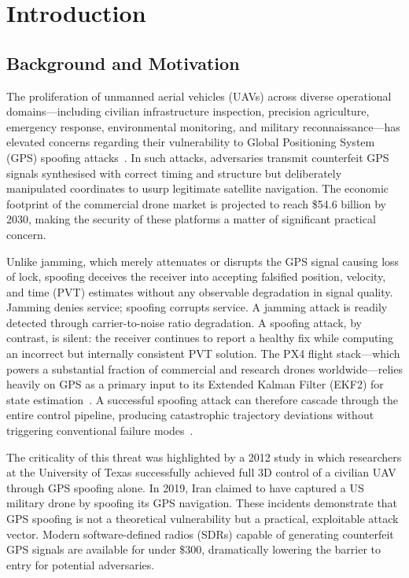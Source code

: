 \chapter{Introduction}

\section{Background and Motivation}

The proliferation of unmanned aerial vehicles (UAVs) across diverse operational domains---including civilian infrastructure inspection, precision agriculture, emergency response, environmental monitoring, and military reconnaissance---has elevated concerns regarding their vulnerability to Global Positioning System (GPS) spoofing attacks~\cite{Humphreys2012}. In such attacks, adversaries transmit counterfeit GPS signals synthesised with correct timing and structure but deliberately manipulated coordinates to usurp legitimate satellite navigation. The economic footprint of the commercial drone market is projected to reach \$54.6 billion by 2030, making the security of these platforms a matter of significant practical concern.

Unlike jamming, which merely attenuates or disrupts the GPS signal causing loss of lock, spoofing deceives the receiver into accepting falsified position, velocity, and time (PVT) estimates without any observable degradation in signal quality. Jamming denies service; spoofing corrupts service. A jamming attack is readily detected through carrier-to-noise ratio degradation. A spoofing attack, by contrast, is silent: the receiver continues to report a healthy fix while computing an incorrect but internally consistent PVT solution. The PX4 flight stack---which powers a substantial fraction of commercial and research drones worldwide---relies heavily on GPS as a primary input to its Extended Kalman Filter (EKF2) for state estimation~\cite{PX4Docs}. A successful spoofing attack can therefore cascade through the entire control pipeline, producing catastrophic trajectory deviations without triggering conventional failure modes~\cite{Kerns2014}.

The criticality of this threat was highlighted by a 2012 study in which researchers at the University of Texas successfully achieved full 3D control of a civilian UAV through GPS spoofing alone. In 2019, Iran claimed to have captured a US military drone by spoofing its GPS navigation. These incidents demonstrate that GPS spoofing is not a theoretical vulnerability but a practical, exploitable attack vector. Modern software-defined radios (SDRs) capable of generating counterfeit GPS signals are available for under \$300, dramatically lowering the barrier to entry for potential adversaries.

